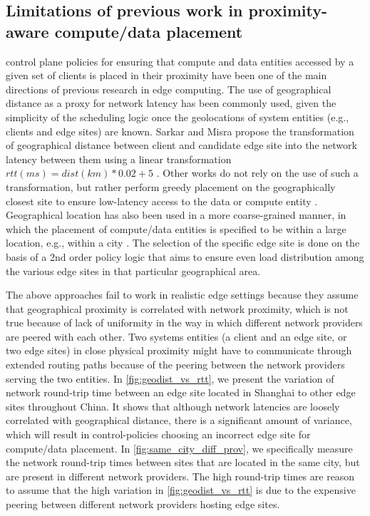 \subsection{Limitations of previous work in proximity-aware compute/data placement}
\label{sec:nw_prox_prev_work}
control plane policies for ensuring that compute and data entities accessed by a given set of clients is placed in their proximity have been one of the main directions of previous research in edge computing. The use of geographical distance as a proxy for network latency has been commonly used, given the simplicity of the scheduling logic once the geolocations of system entities (e.g., clients and edge sites) are known. Sarkar and Misra \cite{sarkar2016theoretical} propose the transformation of geographical distance between client and candidate edge site into the network latency between them using a linear transformation $rtt\left(ms\right) = dist \left(km\right) * 0.02 + 5$ \cite{qureshi2010power}. Other works do not rely on the use of such a transformation, but rather perform greedy placement on the geographically closest site to ensure low-latency access to the data or compute entity \cite{lahderanta2021edge}. Geographical location has also been used in a more coarse-grained manner, in which the placement of compute/data entities is specified to be within a large location, e.g., within a city \cite{vilaccageolocate}. The selection of the specific edge site is done on the basis of a 2nd order policy logic that aims to ensure even load distribution among the various edge sites in that particular geographical area. 
\par The above approaches fail to work in realistic edge settings because they assume that geographical proximity is correlated with network proximity, which is not true because of lack of uniformity in the way in which different network providers are peered with each other. Two systems entities (a client and an edge site, or two edge sites) in close physical proximity might have to communicate through extended routing paths because of the peering between the network providers serving the two entities. In \cref{fig:geodist_vs_rtt}, we present the variation of network round-trip time between an edge site located in Shanghai to other edge sites throughout China. It shows that although network latencies are loosely correlated with geographical distance, there is a significant amount of variance, which will result in control-policies choosing an incorrect edge site for compute/data placement. In \cref{fig:same_city_diff_prov}, we specifically measure the network round-trip times between sites that are located in the same city, but are present in different network providers. The high round-trip times are reason to assume that the high variation in \cref{fig:geodist_vs_rtt} is due to the expensive peering between different network providers hosting edge sites. 
